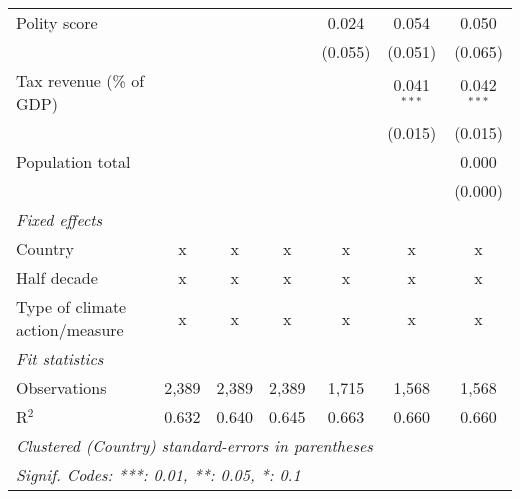 \begin{tabular}{lcccccc}
   Polity score                                                          &         &                &                & 0.024          & 0.054          & 0.050\\   
                                                                         &         &                &                & (0.055)        & (0.051)        & (0.065)\\   
   Tax revenue (\% of GDP)                                               &         &                &                &                & 0.041$^{***}$  & 0.042$^{***}$\\   
                                                                         &         &                &                &                & (0.015)        & (0.015)\\   
   Population total                                                      &         &                &                &                &                & 0.000\\   
                                                                         &         &                &                &                &                & (0.000)\\   
   \emph{Fixed effects}\\
   Country                                                               & x       & x              & x              & x              & x              & x\\  
   Half decade                                                           & x       & x              & x              & x              & x              & x\\  
   Type of climate action/measure                                        & x       & x              & x              & x              & x              & x\\  
   \midrule \emph{Fit statistics}\\
   Observations                                                          & 2,389   & 2,389          & 2,389          & 1,715          & 1,568          & 1,568\\  
   R$^2$                                                                 & 0.632   & 0.640          & 0.645          & 0.663          & 0.660          & 0.660\\  
   \midrule
   \multicolumn{7}{l}{\emph{Clustered (Country) standard-errors in parentheses}}\\
   \multicolumn{7}{l}{\emph{Signif. Codes: ***: 0.01, **: 0.05, *: 0.1}}\\
\end{tabular}
\par\endgroup


